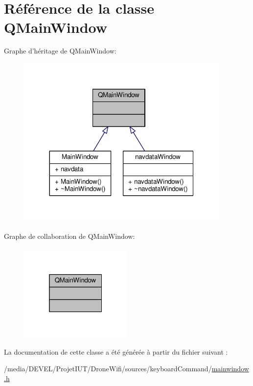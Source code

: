 \hypertarget{class_q_main_window}{\section{Référence de la classe Q\-Main\-Window}
\label{class_q_main_window}
}


Graphe d'héritage de Q\-Main\-Window\-:
\nopagebreak
\begin{figure}[H]
\begin{center}
\leavevmode
\includegraphics[width=299pt]{class_q_main_window__inherit__graph}
\end{center}
\end{figure}


Graphe de collaboration de Q\-Main\-Window\-:
\nopagebreak
\begin{figure}[H]
\begin{center}
\leavevmode
\includegraphics[width=160pt]{class_q_main_window__coll__graph}
\end{center}
\end{figure}


La documentation de cette classe a été générée à partir du fichier suivant \-:\begin{DoxyCompactItemize}
\item 
/media/\-D\-E\-V\-E\-L/\-Projet\-I\-U\-T/\-Drone\-Wifi/sources/keyboard\-Command/\hyperlink{mainwindow_8h}{mainwindow.\-h}\end{DoxyCompactItemize}
